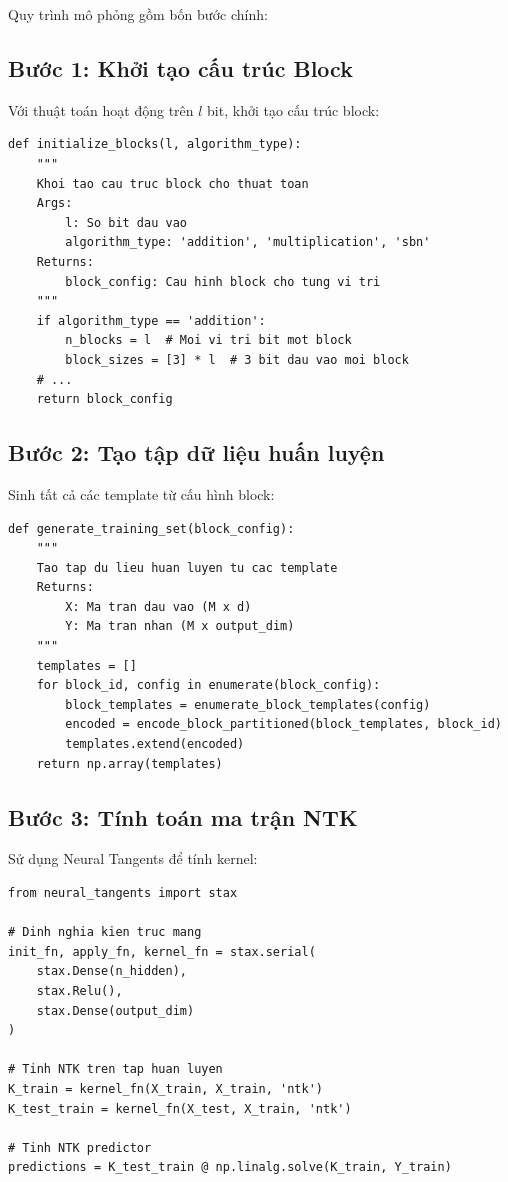 Quy trình mô phỏng gồm bốn bước chính:

\subsection{Bước 1: Khởi tạo cấu trúc Block}

Với thuật toán hoạt động trên $l$ bit, khởi tạo cấu trúc block:
\begin{lstlisting}
def initialize_blocks(l, algorithm_type):
    """
    Khoi tao cau truc block cho thuat toan
    Args:
        l: So bit dau vao
        algorithm_type: 'addition', 'multiplication', 'sbn'
    Returns:
        block_config: Cau hinh block cho tung vi tri
    """
    if algorithm_type == 'addition':
        n_blocks = l  # Moi vi tri bit mot block
        block_sizes = [3] * l  # 3 bit dau vao moi block
    # ...
    return block_config
\end{lstlisting}

\subsection{Bước 2: Tạo tập dữ liệu huấn luyện}

Sinh tất cả các template từ cấu hình block:
\begin{lstlisting}
def generate_training_set(block_config):
    """
    Tao tap du lieu huan luyen tu cac template
    Returns:
        X: Ma tran dau vao (M x d)
        Y: Ma tran nhan (M x output_dim)
    """
    templates = []
    for block_id, config in enumerate(block_config):
        block_templates = enumerate_block_templates(config)
        encoded = encode_block_partitioned(block_templates, block_id)
        templates.extend(encoded)
    return np.array(templates)
\end{lstlisting}

\subsection{Bước 3: Tính toán ma trận NTK}

Sử dụng Neural Tangents để tính kernel:
\begin{lstlisting}
from neural_tangents import stax

# Dinh nghia kien truc mang
init_fn, apply_fn, kernel_fn = stax.serial(
    stax.Dense(n_hidden),
    stax.Relu(),
    stax.Dense(output_dim)
)

# Tinh NTK tren tap huan luyen
K_train = kernel_fn(X_train, X_train, 'ntk')
K_test_train = kernel_fn(X_test, X_train, 'ntk')

# Tinh NTK predictor
predictions = K_test_train @ np.linalg.solve(K_train, Y_train)
\end{lstlisting}

